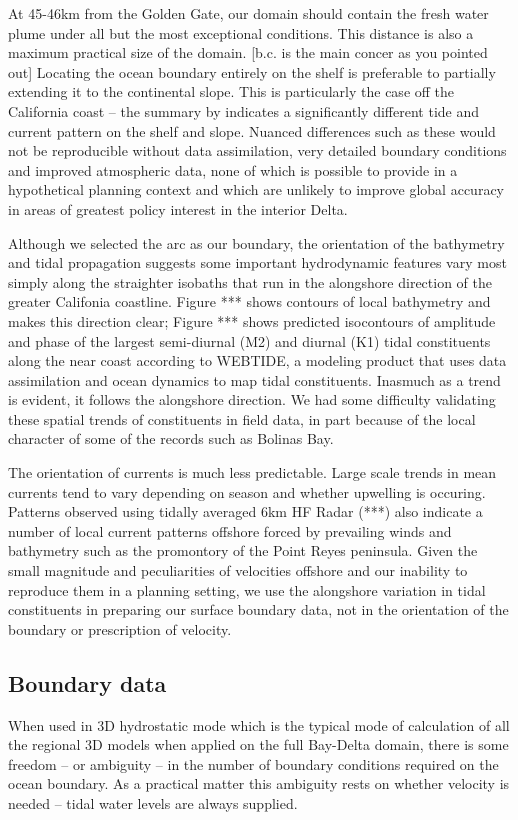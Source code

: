 At 45-46km from the Golden Gate, our domain should contain the fresh water plume under all but the most exceptional conditions. This
distance is also a maximum practical size of the domain. [b.c. is the main concer as you pointed out] 
 Locating the ocean boundary entirely on the shelf is preferable to partially extending it to the continental slope.
This is particularly the case off the California coast -- the summary by \citet{Noble2001} indicates a significantly
different tide and current pattern on the shelf and slope. Nuanced differences such as these would not be reproducible without data assimilation, very detailed boundary conditions and improved atmospheric data, none of which is possible to provide in a hypothetical planning context 
and which are unlikely to improve global accuracy in areas of greatest policy interest in the interior Delta.

Although we selected the arc as our boundary, the orientation of the bathymetry and tidal propagation suggests some important
hydrodynamic features vary most simply along the straighter isobaths that run in the alongshore direction of the greater Califonia
coastline. Figure *** shows contours of local bathymetry and makes this direction clear; Figure *** shows predicted isocontours of
amplitude and phase of the largest semi-diurnal (M2) and diurnal (K1) tidal constituents along the near coast according to WEBTIDE,
 a modeling product that uses data assimilation and ocean dynamics to map tidal constituents. Inasmuch as a trend is evident, it follows the alongshore direction. We had some difficulty validating these spatial trends of constituents in field data, in part because of the local character of some of the records such as Bolinas Bay. 

The orientation of currents is much less predictable. Large scale trends in mean currents tend to vary depending on season and whether upwelling is occuring.  Patterns observed using tidally averaged 6km HF Radar (***) also indicate a number of local current patterns offshore forced by prevailing winds and bathymetry such as the promontory of the Point Reyes peninsula. Given the small magnitude and peculiarities of velocities offshore and our inability to reproduce them in a planning setting, we use the alongshore variation in tidal constituents in preparing our surface boundary data, not in the orientation of the boundary or prescription of velocity. 

\subsection{Boundary data}
When used in 3D hydrostatic mode which is the typical mode of calculation of all the regional 3D models when applied on the full Bay-Delta domain, there is some freedom -- or ambiguity -- in the number of boundary conditions required on the ocean boundary. As a practical matter this ambiguity rests on whether velocity is needed -- tidal water levels are always supplied. 

